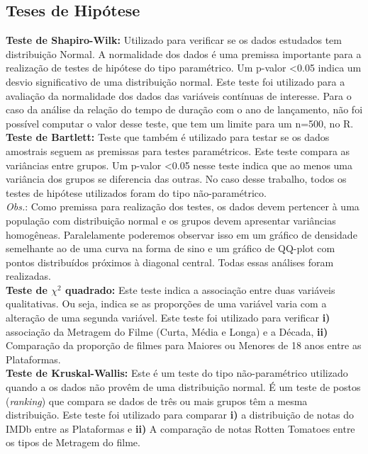 \documentclass[a4paper, 12pt]{article} %
\begin{document}
\subsection{Teses de Hipótese}

\textbf{Teste de Shapiro-Wilk:} Utilizado para verificar se os dados estudados tem distribuição Normal. A normalidade dos dados é uma premissa importante para a realização de testes de hipótese do tipo paramétrico. Um p-valor <0.05 indica um desvio significativo de uma distribuição normal. Este teste foi utilizado para a avaliação da normalidade dos dados das variáveis contínuas de interesse. Para o caso da análise da relação do tempo de duração com o ano de lançamento, não foi possível computar o valor desse teste, que tem um limite para um n=500, no R. \\

\textbf{Teste de Bartlett:} Teste que também é utilizado para testar se os dados amostrais seguem as premissas para testes paramétricos. Este teste compara as variâncias entre grupos. Um p-valor <0.05 nesse teste indica que ao menos uma variância dos grupos se diferencia das outras. No caso desse trabalho, todos os testes de hipótese utilizados foram do tipo não-paramétrico.\\

\emph{Obs.}: Como premissa para realização dos testes, os dados devem pertencer à uma população com distribuição normal e os grupos devem apresentar variâncias homogêneas. Paralelamente poderemos observar isso em um gráfico de densidade semelhante ao de uma curva na forma de sino e um gráfico de QQ-plot com pontos distribuídos próximos à diagonal central. Todas essas análises foram realizadas.\\

\textbf{ Teste de $\chi^2$ quadrado:} Este teste indica a associação entre duas variáveis qualitativas. Ou seja, indica se as proporções de uma variável varia com a alteração de uma segunda variável. Este teste foi utilizado para verificar \textbf{i)} associação da Metragem do Filme (Curta, Média e Longa) e a Década, \textbf{ii)} Comparação da proporção de filmes para Maiores ou Menores de 18 anos entre as Plataformas. \\

\textbf{Teste de Kruskal-Wallis:} Este é um teste do tipo não-paramétrico utilizado quando a os dados não provêm de uma distribuição normal. É um teste de postos (\emph{ranking}) que compara se dados de três ou mais grupos têm a mesma distribuição. Este teste foi utilizado para comparar \textbf{i)}  a distribuição de notas do IMDb entre as Plataformas e \textbf{ii)} A comparação de notas Rotten Tomatoes entre os tipos de Metragem do filme. \\
\end{document}
